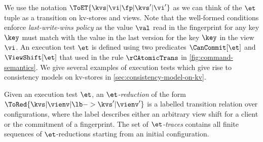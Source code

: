 We use the notation \( \ToET{\kvs | \vi | \fp | \kvs' | \vi' } \) as 
we can think of the \( \et \) tuple as a transition on kv-stores and views. 
Note that the well-formed conditions enforce \emph{last-write-wins policy}
as the value \( \val \) read in the fingerprint for any key \( \key \) 
must match with the value in the last version for the key \( \key \) in the view \( \vi \).
An execution test \( \et \)  is defined using two predicates \( \CanCommit[\et] \) and \( \ViewShift[\et] \)
that used in the rule \( \rCAtomicTrans \) in \cref{fig:command-semantics}.
We give several examples of execution tests which give rise to consistency models on kv-stores in \cref{sec:consistency-model-on-kv}.



Given an execution test \( \et \),
an \emph{\(\et\)-reduction} of the form \( \ToRed{\kvs | \vienv | \lb -> \kvs' | \vienv' }\)
is a labelled transition relation over configurations,
where the label describes either an arbitrary view shift for a client or the commitment of a fingerprint.
The set of \emph{\(\et\)-traces} contains all finite sequences of \(\et\)-reductions starting from an
initial configuration.

